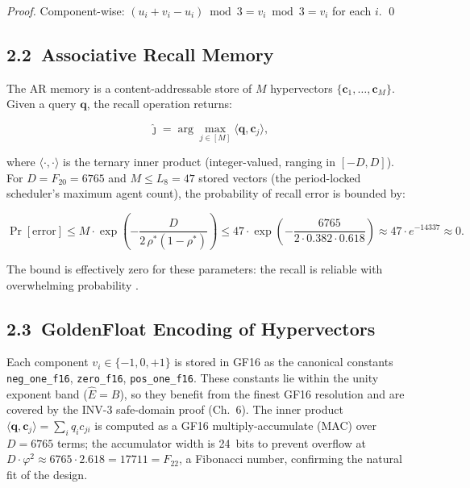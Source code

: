 \begin{proof}
Component-wise: $(u_i + v_i - u_i) \bmod 3
= v_i \bmod 3 = v_i$ for each $i$.
\qed
\end{proof}

\subsection{2.2\ Associative Recall
  Memory}\label{subsec:ch30-ar-memory}

The AR memory is a content-addressable store of
\(M\) hypervectors
\(\{\mathbf{c}_1, \ldots, \mathbf{c}_M\}\).
Given a query \(\mathbf{q}\), the recall
operation returns:

\[\hat\jmath = \arg\max_{j \in [M]}
  \langle \mathbf{q}, \mathbf{c}_j \rangle,\]

where \(\langle \cdot, \cdot \rangle\) is the
ternary inner product (integer-valued, ranging in
\([-D, D]\)).  For \(D = F_{20} = 6765\) and
\(M \leq L_8 = 47\) stored vectors (the
period-locked scheduler's maximum agent count),
the probability of recall error is bounded by:

\[\Pr[\text{error}] \leq M
  \cdot \exp\!\left(
    -\frac{D}{2\,\rho^{*}(1-\rho^{*})}
  \right)
  \leq 47 \cdot \exp\!\left(
    -\frac{6765}{2 \cdot 0.382 \cdot 0.618}
  \right)
  \approx 47 \cdot e^{-14337} \approx 0.\]

The bound is effectively zero for these
parameters: the recall is reliable with
overwhelming probability \cite{plate_hrr}.

\subsection{2.3\ GoldenFloat Encoding of
  Hypervectors}\label{subsec:ch30-gf16-hv}

Each component $v_i \in \{-1, 0, +1\}$ is
stored in GF16 as the canonical constants
\texttt{neg\_one\_f16}, \texttt{zero\_f16},
\texttt{pos\_one\_f16}.  These constants lie
within the unity exponent band (\(\hat{E} = B\)),
so they benefit from the finest GF16 resolution
and are covered by the INV-3 safe-domain proof
(Ch.~6).  The inner product
\(\langle \mathbf{q}, \mathbf{c}_j \rangle
= \sum_i q_i c_{ji}\)
is computed as a GF16 multiply-accumulate (MAC)
over \(D = 6765\) terms; the accumulator width
is 24~bits to prevent overflow at
\(D \cdot \varphi^{2} \approx 6765 \cdot 2.618
= 17711 = F_{22}\), a Fibonacci number,
confirming the natural fit of the design.

